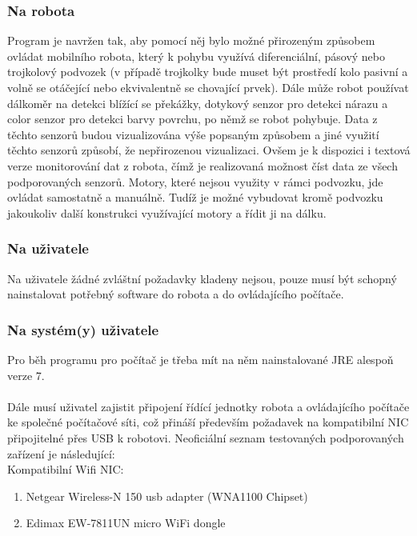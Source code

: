 \documentclass[12pt, ngerman]{article}
\begin{document}
\subsubsection{Na robota}
Program je navržen tak, aby pomocí něj bylo možné přirozeným způsobem ovládat  mobilního robota, který k pohybu využívá diferenciální, pásový nebo trojkolový podvozek (v případě trojkolky bude muset být prostředí kolo pasivní a volně se otáčející nebo ekvivalentně se chovající prvek). Dále může robot používat dálkoměr na detekci blížící se překážky, dotykový senzor pro detekci nárazu a color senzor pro detekci barvy povrchu, po němž se robot pohybuje. Data z těchto senzorů budou vizualizována výše popsaným způsobem a jiné využití těchto senzorů způsobí, že nepřirozenou vizualizaci. Ovšem je k dispozici i textová verze monitorování dat z robota, čímž je realizovaná možnost číst data ze všech podporovaných senzorů. Motory, které nejsou využity v rámci podvozku, jde ovládat samostatně a manuálně. Tudíž je možné vybudovat kromě podvozku jakoukoliv další konstrukci využívající motory a řídit ji na dálku.

\subsubsection{Na uživatele}
Na uživatele žádné zvláštní požadavky kladeny nejsou, pouze musí být schopný nainstalovat potřebný software do robota a do ovládajícího počítače.

\subsubsection{Na systém(y) uživatele}
Pro běh programu pro počítač je třeba mít na něm nainstalované JRE alespoň verze 7.\\\\
Dále musí uživatel zajistit připojení řídící jednotky robota a ovládajícího počítače ke společné počítačové síti, což přináší především požadavek na kompatibilní NIC připojitelné přes USB k robotovi. Neoficiální seznam testovaných podporovaných zařízení je následující:\\

Kompatibilní Wifi NIC:
\begin{enumerate}[leftmargin=5mm]
\item Netgear Wireless-N 150 usb adapter (WNA1100 Chipset)
\item Edimax EW-7811UN micro WiFi dongle
\end{enumerate} 
\end{document}

